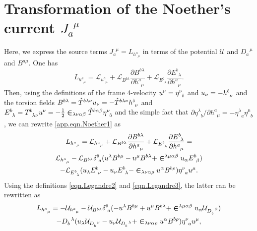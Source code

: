 \documentclass[
10pt, %
a4paper, %
oneside, %
headinclude,footinclude, %
BCOR5mm, %
]{scrartcl}
\newcommand{\tetrsymbol}{h}
\newcommand{\itetrsymbol}{\eta}
\newcommand{\itetr}[2]{\itetrsymbol^{#1}_{\phantom{#1}#2}}
\newcommand{\tetr}[2]{\tetrsymbol^{#1}_{\phantom{#1}#2}}
\newcommand{\Tors}[2]{T^{#1}_{\phantom{a}#2}}
\newcommand{\ET}[2]{E^{#1}_{\phantom{#1}#2}}	%
\newcommand{\dT}[2]{D_{#1}^{\phantom{#1}\,#2}}	%
\newcommand{\BT}[2]{B^{#1#2}}	%
\newcommand{\bT}[2]{B^{#1#2}}	%
\newcommand{\Laghodge}{L}%
\newcommand{\LagBE}{\mathcal{L}}%
\newcommand{\LagST}{\mathcal{U}}%
\newcommand{\LCsymb}{\bm{\in}}    %
\newcommand{\HDT}[1]{\accentset{\star}{T}^{#1}}
\newcommand{\KD}[2]{\delta^{#1}_{\,\,#2}}
\newcommand{\NC}[2]{J^{\phantom{#1}#2}_{#1}}
\newcommand{\indalg}[1]{\hat{\mathsmaller{#1}}}
\begin{document}
\section{Transformation of the Noether's current $ \NC{a}{\mu} $}\label{app.sec.NC}

Here, we express the source terms $ \NC{a}{\mu} = \Laghodge_{\tetr{a}{\mu}} $ in terms of the 
potential $ \LagST $ and $ \dT{a}{\mu} $ and $ \bT{a}{\mu} $. One has
\begin{equation}\label{app.eqn.Noether1}
	\Laghodge_{\tetr{a}{\mu}} = \LagBE_{\tetr{a}{\mu}} 
	+ \LagBE_{\BT{b}{\lambda}} \frac{\partial \BT{b}{\lambda}}{\partial \tetr{a}{\mu}}
	+ \LagBE_{\ET{b}{\lambda}} \frac{\partial \ET{b}{\lambda}}{\partial \tetr{a}{\mu}}.
\end{equation}
Then, using the definitions of the frame 4-velocity $ u^\nu = \itetr{\nu}{\indalg{0}} $ and $ u_\nu 
= 
-\tetr{\indalg{0}}{\nu} $ and the torsion fields
$ \BT{b}{\lambda} = \HDT{b\lambda\nu} u_\nu = - \HDT{b\lambda\nu} \tetr{\indalg{0}}{\nu}$ and 
$ \ET{b}{\lambda} = \Tors{b}{\lambda\nu} u^\nu = 
-\frac12\LCsymb_{\lambda\nu\alpha\beta}\HDT{b\alpha\beta} \itetr{\nu}{\indalg{0}}$ and the simple 
fact 
that $ \partial\itetr{\lambda}{b}/\partial\tetr{a}{\mu} = -\itetr{\lambda}{a}\itetr{\mu}{b} $, we 
can rewrite \eqref{app.eqn.Noether1} as
\begin{multline}
	\Laghodge_{\tetr{a}{\mu}} = \LagBE_{\tetr{a}{\mu}} 
	+ \LagBE_{\BT{b}{\lambda}} \frac{\partial \BT{b}{\lambda}}{\partial \tetr{a}{\mu}}
	+ \LagBE_{\ET{b}{\lambda}} \frac{\partial \ET{b}{\lambda}}{\partial \tetr{a}{\mu}} = \\
	\LagBE_{\tetr{a}{\mu}} - \LagBE_{\BT{b}{\lambda}} \KD{\indalg{0}}{a}
	(u^\lambda \BT{b}{\mu} - u^\mu \BT{b}{\lambda}+\LCsymb^{\lambda\mu\alpha\beta} u_\alpha  
	\ET{b}{\beta}) \\
	-\LagBE_{\ET{b}{\lambda}} (u_\lambda \ET{b}{\nu} - u_\nu \ET{b}{\lambda} - 
	\LCsymb_{\lambda\nu\alpha\rho}u^\alpha\BT{b}{\rho})\itetr{\nu}{a}u^\mu.
\end{multline}
Using the definitions \eqref{eqn.Legandre2} and \eqref{eqn.Legandre3}, the latter can be rewritten 
as
\begin{multline}
	\Laghodge_{\tetr{a}{\mu}} =
	-\LagST_{\tetr{a}{\mu}} 
	- \LagST_{\bT{b}{\lambda}} \KD{\indalg{0}}{a}
	(-u^\lambda \bT{b}{\mu} + u^\mu \bT{b}{\lambda}+\LCsymb^{\lambda\mu\alpha\beta} u_\alpha 
	\LagST_{\dT{b}{\beta}}) \\
	-\dT{b}{\lambda} (u_\lambda \LagST_{\dT{b}{\nu}} - u_\nu \LagST_{\dT{b}{\lambda}} + 
	\LCsymb_{\lambda\nu\alpha\rho}u^\alpha\bT{b}{\rho})\itetr{\nu}{a}u^\mu,
\end{multline}
\end{document}
